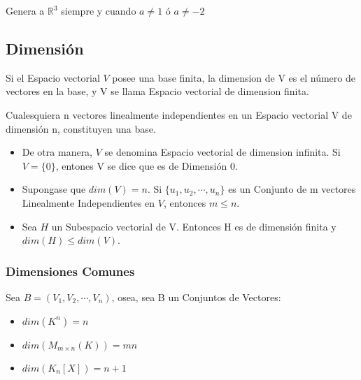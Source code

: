 \documentclass[12pt]{report}							    %
\begin{document}
            Genera a $\mathbb{R}^3$ siempre y cuando $a \neq 1$ ó $a \neq -2$ 


        \clearpage
        \subsection{Dimensión}
        Si el Espacio vectorial $V$ posee una base finita, la dimension de V es el 
        número de vectores en la base, y V se llama Espacio vectorial de dimension finita.

        Cualesquiera n vectores linealmente independientes en un Espacio
        vectorial V de dimensión n, constituyen una base.

        \begin{itemize}
            \item De otra manera, $V$ se denomina Espacio vectorial de dimension infinita.
            Si $V=\{0\}$, entones V se dice que es de Dimensión 0.

            \item Supongase que $dim(V) = n$. Si $\{u_1, u_2, \cdots, u_n\}$ es un Conjunto de m vectores
            Linealmente Independientes en $V$, entonces $m \leq n$.

            \item Sea $H$ un Subespacio vectorial de V. Entonces H es de dimensión finita
            y $dim(H) \leq dim(V)$.

        \end{itemize}


        \subsubsection{Dimensiones Comunes}
        Sea $ B = (V_1, V_2, \cdots, V_n)$, osea, sea B un Conjuntos de Vectores:

        \begin{itemize}
            \item $dim(K^n) = n$
            \item $dim(M_{m \times n}(K)) = mn$
            \item $dim(K_{n}{[X]}) = n + 1$
        \end{itemize}


\end{document}
